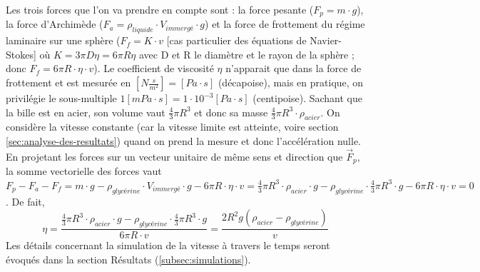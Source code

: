 \begin{minipage}{0.7\textwidth}
    Les trois forces que l'on va prendre en compte sont : la force pesante
    ($F_{p}=m \cdot g $), la force d'Archimède ($F_{a}=\rho_{liquide}
    \cdot V_{immergé} \cdot g $) et la force de frottement du régime laminaire sur une sphère ($F_{f}=
    K \cdot v $ [cas particulier des équations de Navier-Stokes] où $K = 3 \pi D \eta = 6 \pi R \eta $ avec D et R le diamètre et le rayon de la
    sphère ;
    donc $F_{f} =  6 \pi R \cdot \eta \cdot v $).
    Le coefficient de viscosité $\eta$ n'apparait que dans la force de frottement et est mesurée
    en $\left[N \frac{s}{m^{2}}  \right]  = [Pa \cdot s]$ (décapoise), mais en pratique, on privilégie
    le sous-multiple $1 [mPa \cdot s] = 1 \cdot 10^{-3} [Pa \cdot s]$ (centipoise).
    Sachant que la bille est en acier, son volume vaut $\frac{4}{3}\pi R^{3} $ et donc sa masse
    $\frac{4}{3}\pi R^{3} \cdot \rho_{acier} $.
    On considère la vitesse constante (car la vitesse limite est atteinte, voire section \ref{sec:analyse-des-resultats})
    quand on prend la mesure et donc l'accélération nulle.
    En projetant les forces sur un vecteur unitaire de même sens et direction que $\vec{F}_{p} $,
    la somme vectorielle des forces vaut $F_{p}-F_{a}-F_{f}= m \cdot g - \rho_{glycérine}
    \cdot V_{immergé} \cdot g - 6 \pi R \cdot \eta \cdot v = \frac{4}{3}\pi R^{3} \cdot \rho_{acier}
    \cdot g - \rho_{glycérine} \cdot \frac{4}{3}\pi R^{3} \cdot g - 6 \pi R \cdot \eta \cdot v = 0$.
    De fait,
    \[\eta = \frac{\frac{4}{3}\pi R^{3} \cdot \rho_{acier} \cdot g - \rho_{glycérine} \cdot
    \frac{4}{3}\pi R^{3} \cdot g}{6 \pi R  \cdot v} = \frac{2 R^{2} g (\rho_{acier} - \rho_{glycérine})}
    {v} \]
    Les détails concernant la simulation de la vitesse à travers le temps seront évoqués dans la section
    Résultats (\ref{subsec:simulations}).

\end{minipage}
\begin{minipage}{0.05\textwidth}
\end{minipage}
